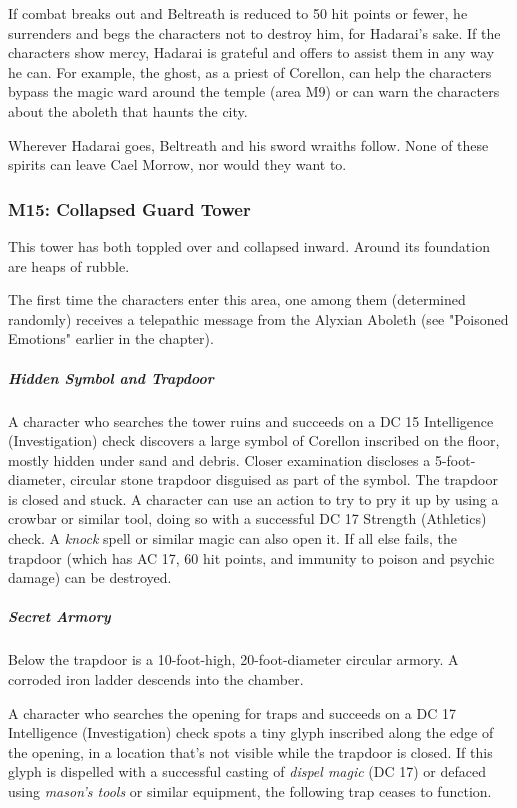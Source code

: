 \documentclass[10pt,a4paper,twoside,fancy,bg=print,twocolumn,openany,nodeprecatedcode]{dndbook}
\begin{document}
If combat breaks out and Beltreath is reduced to 50 hit points or fewer, he surrenders and begs the characters not to destroy him, for Hadarai's sake. If the characters show mercy, Hadarai is grateful and offers to assist them in any way he can. For example, the ghost, as a priest of Corellon, can help the characters bypass the magic ward around the temple (area M9) or can warn the characters about the aboleth that haunts the city.

Wherever Hadarai goes, Beltreath and his sword wraiths follow. None of these spirits can leave Cael Morrow, nor would they want to.

\subsubsection{M15: Collapsed Guard Tower}
\begin{DndReadAloud}{}
This tower has both toppled over and collapsed inward. Around its foundation are heaps of rubble.

\end{DndReadAloud}

The first time the characters enter this area, one among them (determined randomly) receives a telepathic message from the Alyxian Aboleth (see "Poisoned Emotions" earlier in the chapter).

\subparagraph{Hidden Symbol and Trapdoor}
A character who searches the tower ruins and succeeds on a DC 15 Intelligence (Investigation) check discovers a large symbol of Corellon inscribed on the floor, mostly hidden under sand and debris. Closer examination discloses a 5-foot-diameter, circular stone trapdoor disguised as part of the symbol. The trapdoor is closed and stuck. A character can use an action to try to pry it up by using a crowbar or similar tool, doing so with a successful DC 17 Strength (Athletics) check. A \textit{knock} spell or similar magic can also open it. If all else fails, the trapdoor (which has AC 17, 60 hit points, and immunity to poison and psychic damage) can be destroyed.

\subparagraph{Secret Armory}
Below the trapdoor is a 10-foot-high, 20-foot-diameter circular armory. A corroded iron ladder descends into the chamber.

A character who searches the opening for traps and succeeds on a DC 17 Intelligence (Investigation) check spots a tiny glyph inscribed along the edge of the opening, in a location that's not visible while the trapdoor is closed. If this glyph is dispelled with a successful casting of \textit{dispel magic} (DC 17) or defaced using \textit{mason's tools} or similar equipment, the following trap ceases to function.
\end{document}
